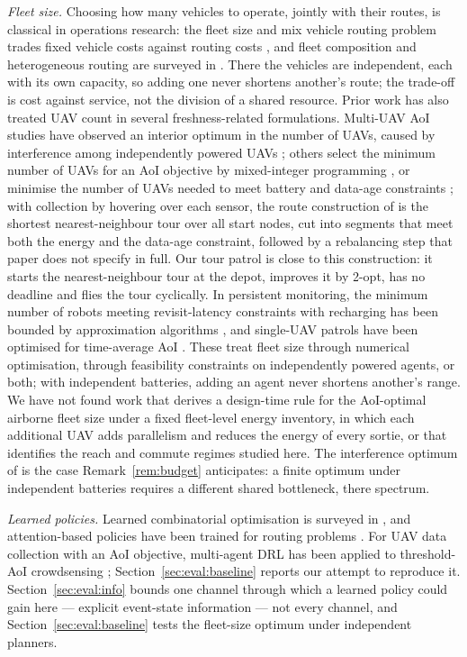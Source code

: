 \documentclass[journal,outdir=./]{IEEEtran}
\begin{document}
\textit{Fleet size.} Choosing how many vehicles to operate, jointly with their routes, is classical in operations research: the fleet size and mix vehicle routing problem trades fixed vehicle costs against routing costs \cite{golden1984fsm}, and fleet composition and heterogeneous routing are surveyed in \cite{hoff2010fleet,koc2016thirty}. There the vehicles are independent, each with its own capacity, so adding one never shortens another's route; the trade-off is cost against service, not the division of a shared resource. Prior work has also treated UAV count in several freshness-related formulations. Multi-UAV AoI studies have observed an interior optimum in the number of UAVs, caused by interference among independently powered UAVs \cite{wang2023cooperative}; others select the minimum number of UAVs for an AoI objective by mixed-integer programming \cite{tekin2025secure}, or minimise the number of UAVs needed to meet battery and data-age constraints \cite{yu2025fleet}; with collection by hovering over each sensor, the route construction of \cite{yu2025fleet} is the shortest nearest-neighbour tour over all start nodes, cut into segments that meet both the energy and the data-age constraint, followed by a rebalancing step that paper does not specify in full. Our tour patrol is close to this construction: it starts the nearest-neighbour tour at the depot, improves it by 2-opt, has no deadline and flies the tour cyclically. In persistent monitoring, the minimum number of robots meeting revisit-latency constraints with recharging has been bounded by approximation algorithms \cite{asghar2025persistent}, and single-UAV patrols have been optimised for time-average AoI \cite{wangxu2025patrol}. These treat fleet size through numerical optimisation, through feasibility constraints on independently powered agents, or both; with independent batteries, adding an agent never shortens another's range. We have not found work that derives a design-time rule for the AoI-optimal airborne fleet size under a fixed fleet-level energy inventory, in which each additional UAV adds parallelism and reduces the energy of every sortie, or that identifies the reach and commute regimes studied here. The interference optimum of \cite{wang2023cooperative} is the case Remark~\ref{rem:budget} anticipates: a finite optimum under independent batteries requires a different shared bottleneck, there spectrum.

\textit{Learned policies.} Learned combinatorial optimisation is surveyed in \cite{bengio2021mlco}, and attention-based policies have been trained for routing problems \cite{kool2019attention}. For UAV data collection with an AoI objective, multi-agent DRL has been applied to threshold-AoI crowdsensing \cite{wang2024drlucs}; Section~\ref{sec:eval:baseline} reports our attempt to reproduce it. Section~\ref{sec:eval:info} bounds one channel through which a learned policy could gain here --- explicit event-state information --- not every channel, and Section~\ref{sec:eval:baseline} tests the fleet-size optimum under independent planners.
\end{document}
